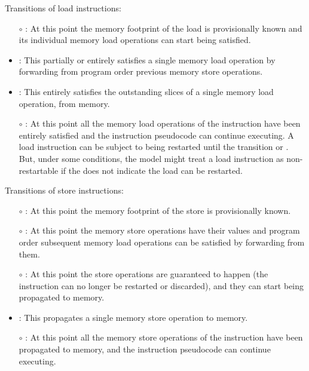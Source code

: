 \noindent Transitions of load instructions:
\begin{itemize}
\item[$\circ$] : At this point the memory footprint of the load is provisionally known and its individual memory load operations can start being satisfied.
\item {}: This partially or entirely satisfies a single memory load operation by forwarding from program order previous memory store operations.
\item {}: This entirely satisfies the outstanding slices of a single memory load operation, from memory.
\item[$\circ$] : At this point all the memory load operations of the instruction have been entirely satisfied and the instruction pseudocode can continue executing.
A load instruction can be subject to being restarted until the  transition or .
But, under some conditions, the model might treat a load instruction as non-restartable if the  does not indicate the load can be restarted.
\end{itemize}

\noindent Transitions of store instructions:
\begin{itemize}
\item[$\circ$] : At this point the memory footprint of the store is provisionally known.
\item[$\circ$] : At this point the memory store operations have their values and program order subsequent memory load operations can be satisfied by forwarding from them.
\item[$\circ$] : At this point the store operations are guaranteed to happen (the instruction can no longer be restarted or discarded), and they can start being propagated to memory.
\item {}: This propagates a single memory store operation to memory.
\item[$\circ$] : At this point all the memory store operations of the instruction have been propagated to memory, and the instruction pseudocode can continue executing.
\end{itemize}

